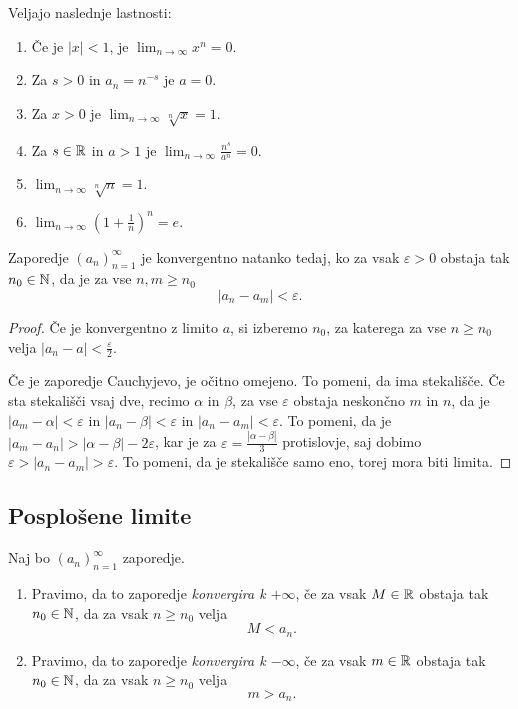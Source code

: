 \documentclass[12pt, a4paper]{article}
\begin{document}
\begin{posledica}
Veljajo naslednje lastnosti:

\begin{enumerate}[label=\roman*)]
\item Če je $|x|<1$, je $\displaystyle\lim_{n\to\infty}x^n=0$.
\item Za $s>0$ in $a_n=n^{-s}$ je $a=0$.
\item Za $x>0$ je $\displaystyle\lim_{n\to\infty}\sqrt[n]{x}=1$.
\item Za $s\in\mathbb{R}$ in $a>1$ je $\displaystyle\lim_{n\to\infty}\frac{n^s}{a^n}=0$.
\item $\displaystyle\lim_{n\to\infty}\sqrt[n]{n}=1$.
\item $\displaystyle\lim_{n\to\infty}\left(1+\frac{1}{n}\right)^n=e$.
\end{enumerate}
\end{posledica}

\begin{izrek}
Zaporedje $(a_n)_{n=1}^\infty$ je konvergentno natanko tedaj, ko za vsak $\varepsilon>0$ obstaja tak $n_0\in\mathbb{N}$, da je za vse $n,m\geq n_0$
\[
|a_n-a_m|<\varepsilon.
\]
\end{izrek}

\begin{proof}
Če je konvergentno z limito $a$, si izberemo $n_0$, za katerega za vse $n\geq n_0$ velja $|a_n-a|<\frac{\varepsilon}{2}$.

Če je zaporedje Cauchyjevo, je očitno omejeno. To pomeni, da ima stekališče. Če sta stekališči vsaj dve, recimo $\alpha$ in $\beta$, za vse $\varepsilon$ obstaja neskončno $m$ in $n$, da je $|a_m-\alpha|<\varepsilon$ in $|a_n-\beta|<\varepsilon$ in $|a_n-a_m|<\varepsilon$. To pomeni, da je $|a_m-a_n|>|\alpha-\beta|-2\varepsilon$, kar je za $\varepsilon=\frac{|\alpha-\beta|}{3}$ protislovje, saj dobimo $\varepsilon>|a_n-a_m|>\varepsilon$. To pomeni, da je stekališče samo eno, torej mora biti limita.
\end{proof}

\newpage

\subsection{Posplošene limite}

\begin{definicija}
Naj bo $(a_n)_{n=1}^\infty$ zaporedje.

\begin{enumerate}[label=\roman*)]
\item Pravimo, da to zaporedje \emph{konvergira k $+\infty$}, če za vsak $M\in\mathbb{R}$ obstaja tak $n_0\in\mathbb{N}$, da za vsak $n\geq n_0$ velja
\[
M<a_n.
\]
\item Pravimo, da to zaporedje \emph{konvergira k $-\infty$}, če za vsak $m\in\mathbb{R}$ obstaja tak $n_0\in\mathbb{N}$, da za vsak $n\geq n_0$ velja
\[
m>a_n.
\]
\end{enumerate}
\end{definicija}
\end{document}
